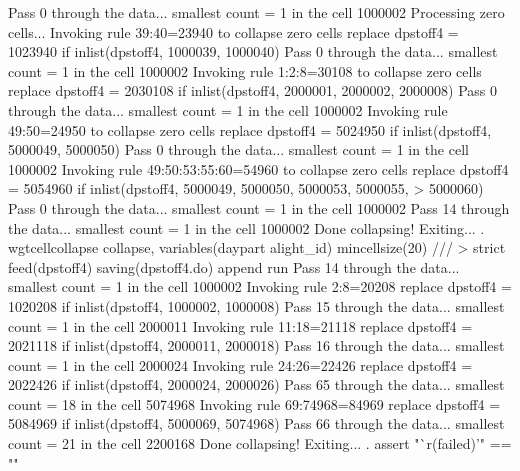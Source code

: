 Pass 0 through the data...
  smallest count = 1 in the cell      1000002
{\smallskip}
Processing zero cells...
{\smallskip}
  Invoking rule 39:40=23940 to collapse zero cells
  replace dpstoff4 = 1023940 if inlist(dpstoff4, 1000039, 1000040)
Pass 0 through the data...
  smallest count = 1 in the cell      1000002
  Invoking rule 1:2:8=30108 to collapse zero cells
  replace dpstoff4 = 2030108 if inlist(dpstoff4, 2000001, 2000002, 2000008)
\smallskip
\oom
\smallskip
Pass 0 through the data...
  smallest count = 1 in the cell      1000002
  Invoking rule 49:50=24950 to collapse zero cells
  replace dpstoff4 = 5024950 if inlist(dpstoff4, 5000049, 5000050)
Pass 0 through the data...
  smallest count = 1 in the cell      1000002
  Invoking rule 49:50:53:55:60=54960 to collapse zero cells
  replace dpstoff4 = 5054960 if inlist(dpstoff4, 5000049, 5000050, 5000053, 5000055,
>  5000060)
Pass 0 through the data...
  smallest count = 1 in the cell      1000002
Pass 14 through the data...
  smallest count = 1 in the cell      1000002
  Done collapsing! Exiting...
{\smallskip}
. wgtcellcollapse collapse, variables(daypart alight_id) mincellsize(20) ///
>         strict feed(dpstoff4) saving(dpstoff4.do) append run
Pass 14 through the data...
  smallest count = 1 in the cell      1000002
  Invoking rule 2:8=20208
  replace dpstoff4 = 1020208 if inlist(dpstoff4, 1000002, 1000008)
Pass 15 through the data...
  smallest count = 1 in the cell      2000011
  Invoking rule 11:18=21118
  replace dpstoff4 = 2021118 if inlist(dpstoff4, 2000011, 2000018)
Pass 16 through the data...
  smallest count = 1 in the cell      2000024
  Invoking rule 24:26=22426
  replace dpstoff4 = 2022426 if inlist(dpstoff4, 2000024, 2000026)
\smallskip
\oom
\smallskip
Pass 65 through the data...
  smallest count = 18 in the cell      5074968
  Invoking rule 69:74968=84969
  replace dpstoff4 = 5084969 if inlist(dpstoff4, 5000069, 5074968)
Pass 66 through the data...
  smallest count = 21 in the cell      2200168
  Done collapsing! Exiting...
{\smallskip}
. assert "`r(failed)'" == ""
{\smallskip}
